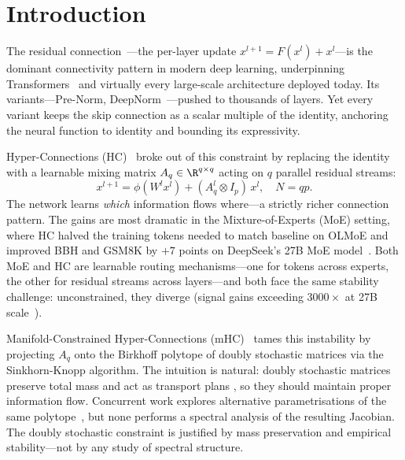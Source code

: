 
\section{Introduction}\label{sec:intro}

The residual connection~\cite{he2016deep}---the per-layer update $x^{l+1} = F(x^l) + x^l$---is the dominant connectivity pattern in modern deep learning, underpinning Transformers~\cite{vaswani2017attention} and virtually every large-scale architecture deployed today. Its variants---Pre-Norm, DeepNorm~\cite{wang2022deepnorm}---pushed to thousands of layers. Yet every variant keeps the skip connection as a scalar multiple of the identity, anchoring the neural function to identity and bounding its expressivity.

Hyper-Connections (HC)~\cite{zhu2024hyperconnections} broke out of this constraint by replacing the identity with a learnable mixing matrix $A_q \in \R^{q \times q}$ acting on $q$ parallel residual streams:
\begin{equation}\label{eq:hc-skip}
x^{l+1} = \phi(W^l x^l) + (A_q^l \otimes I_p)\, x^l, \quad N = qp.
\end{equation}
The network learns \emph{which} information flows where---a strictly richer connection pattern. The gains are most dramatic in the Mixture-of-Experts (MoE) setting, where HC halved the training tokens needed to match baseline on OLMoE and improved BBH and GSM8K by $+7$ points on DeepSeek's 27B MoE model~\cite{zhu2024hyperconnections,xie2025mhc}. Both MoE and HC are learnable routing mechanisms---one for tokens across experts, the other for residual streams across layers---and both face the same stability challenge: unconstrained, they diverge (signal gains exceeding $3000\times$ at 27B scale~\cite{xie2025mhc}).

Manifold-Constrained Hyper-Connections (mHC)~\cite{xie2025mhc} tames this instability by projecting $A_q$ onto the Birkhoff polytope of doubly stochastic matrices via the Sinkhorn-Knopp algorithm. The intuition is natural: doubly stochastic matrices preserve total mass and act as transport plans \cite{villani2021topics}, so they should maintain proper information flow. Concurrent work explores alternative parametrisations of the same polytope~\cite{kromhc2026,noguer2026}, but none performs a spectral analysis of the resulting Jacobian. The doubly stochastic constraint is justified by mass preservation and empirical stability---not by any study of spectral structure.


